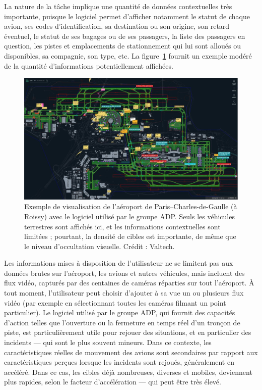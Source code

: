 	La nature de la tâche implique une quantité de données contextuelles très importante, puisque le logiciel permet d'afficher notamment le statut de chaque avion, ses codes d'identification, sa destination ou son origine, son retard éventuel, le statut de ses bagages ou de ses passagers, la liste des passagers en question, les pistes et emplacements de stationnement qui lui sont alloués ou disponibles, sa compagnie, son type, etc. La figure~\ref{fig:adp} fournit un exemple modéré de la quantité d'informations potentiellement affichées.
	
	\begin{figure}[H]
		\centering
		\includegraphics[width=\textwidth]{figures/ch1/adp}
		\caption[ADP -- Roissy.]{Exemple de visualisation de l'aéroport de Paris--Charles-de-Gaulle (à Roissy) avec le logiciel utilisé par le groupe ADP. Seuls les véhicules terrestres sont affichés ici, et les informations contextuelles sont limitées ; pourtant, la densité de cibles est importante, de même que le niveau d'occultation visuelle. Crédit : Valtech.}
		\label{fig:adp}
	\end{figure}
	
	Les informations mises à disposition de l'utilisateur ne se limitent pas aux données brutes sur l'aéroport, les avions et autres véhicules, mais incluent des flux vidéo, capturés par des centaines de caméras réparties sur tout l'aéroport. À tout moment, l'utilisateur peut choisir d'ajouter à sa vue un ou plusieurs flux vidéo (par exemple en sélectionnant toutes les caméras filmant un point particulier). Le logiciel utilisé par le groupe ADP, qui fournit des capacités d'action telles que l'ouverture ou la fermeture en temps réel d'un tronçon de piste, est particulièrement utile pour rejouer des situations, et en particulier des incidents --- qui sont le plus souvent mineurs. Dans ce contexte, les caractéristiques réelles de mouvement des avions sont secondaires par rapport aux caractéristiques perçues lorsque les incidents sont rejoués, généralement en accéléré. Dans ce cas, les cibles déjà nombreuses, diverses et mobiles, deviennent plus rapides, selon le facteur d'accélération --- qui peut être très élevé.
	
